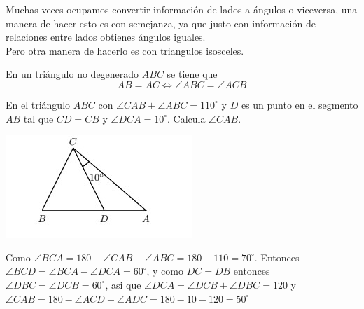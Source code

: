 \documentclass[11pt]{scrartcl}
\begin{document}
Muchas veces ocupamos convertir informaci\'on de lados a \'angulos o viceversa, una manera de hacer esto es con semejanza, ya que justo con informaci\'on de relaciones entre lados obtienes \'angulos iguales. \\
Pero otra manera de hacerlo es con triangulos isosceles. 
\begin{theorem}
    En un tri\'angulo no degenerado $ABC$ se tiene que 
    $$AB=AC \Longleftrightarrow \angle ABC = \angle ACB$$
\end{theorem}
\begin{example}
    En el tri\'angulo $ABC$ con $\angle CAB+\angle ABC=110^{\circ}$ y $D$ es un punto en el segmento $AB$ tal que $CD=CB$ y $\angle DCA=10^{\circ}$. Calcula $\angle CAB$.
    \begin{center}
    \includegraphics[scale=1]{ACImg1.jpg}
    \end{center}
\end{example}
\begin{soln}
    Como $\angle BCA=180-\angle CAB-\angle ABC=180-110=70^{\circ}$. Entonces $\angle BCD=\angle BCA-\angle DCA=60^{\circ}$, y como $DC=DB$ entonces $\angle DBC=\angle DCB=60^{\circ}$, asi que $\angle DCA=\angle DCB+\angle DBC=120$ y $\angle CAB=180-\angle ACD+\angle ADC=180-10-120=50^{\circ}$
\end{soln}
\end{document}

